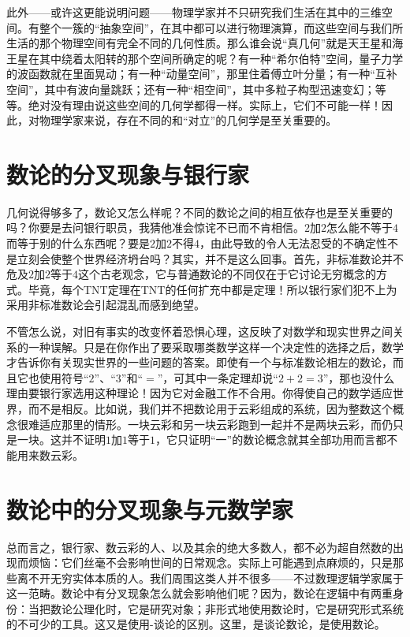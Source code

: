 此外——或许这更能说明问题——物理学家并不只研究我们生活在其中的三维空间。有整个一簇的“抽象空间”，在其中都可以进行物理演算，而这些空间与我们所生活的那个物理空间有完全不同的几何性质。那么谁会说“真几何”就是天王星和海王星在其中绕着太阳转的那个空间所确定的呢？有一种“希尔伯特”空间，量子力学的波函数就在里面晃动；有一种“动量空间”，那里住着傅立叶分量；有一种“互补空间”，其中有波向量跳跃；还有一种“相空间”，其中多粒子构型迅速变幻；等等。绝对没有理由说这些空间的几何学都得一样。实际上，它们不可能一样！因此，对物理学家来说，存在不同的和“对立”的几何学是至关重要的。

\section{数论的分叉现象与银行家}

几何说得够多了，数论又怎么样呢？不同的数论之间的相互依存也是至关重要的吗？你要是去问银行职员，我猜他准会惊诧不已而不肯相信。$2$加$2$怎么能不等于$4$而等于别的什么东西呢？要是$2$加$2$不得$4$，由此导致的令人无法忍受的不确定性不是立刻会使整个世界经济坍台吗？其实，并不是这么回事。首先，非标准数论并不危及$2$加$2$等于$4$这个古老观念，它与普通数论的不同仅在于它讨论无穷概念的方式。毕竟，每个TNT定理在TNT的任何扩充中都是定理！所以银行家们犯不上为采用非标准数论会引起混乱而感到绝望。

不管怎么说，对旧有事实的改变怀着恐惧心理，这反映了对数学和现实世界之间关系的一种误解。只是在你作出了要采取哪类数学这样一个决定性的选择之后，数学才告诉你有关现实世界的一些问题的答案。即使有一个与标准数论相左的数论，而且它也使用符号“$2$”、“$3$”和“$=$”，可其中一条定理却说“$2+2=3$”，那也没什么理由要银行家选用这种理论！因为它对金融工作不合用。你得使自己的数学适应世界，而不是相反。比如说，我们并不把数论用于云彩组成的系统，因为整数这个概念很难适应那里的情形。一块云彩和另一块云彩跑到一起并不是两块云彩，而仍只是一块。这并不证明$1$加$1$等于$1$，它只证明“一”的数论概念就其全部功用而言都不能用来数云彩。

\section{数论中的分叉现象与元数学家}

总而言之，银行家、数云彩的人、以及其余的绝大多数人，都不必为超自然数的出现而烦恼：它们丝毫不会影响世间的日常观念。实际上可能遇到点麻烦的，只是那些离不开无穷实体本质的人。我们周围这类人并不很多——不过数理逻辑学家属于这一范畴。数论中有分叉现象怎么就会影响他们呢？因为，数论在逻辑中有两重身份：当把数论公理化时，它是研究对象；非形式地使用数论时，它是研究形式系统的不可少的工具。这又是使用-谈论的区别。这里，是谈论数论，是使用数论。

